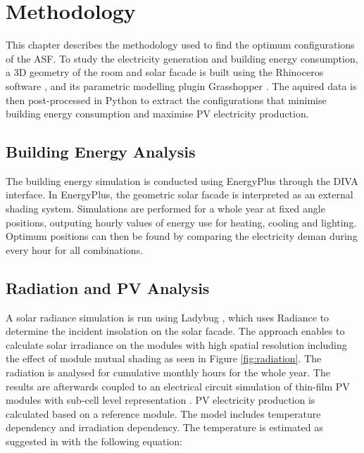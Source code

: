 \chapter{Methodology}

	This chapter describes the methodology used to find the optimum configurations of the ASF. To study the electricity generation and building energy consumption, a 3D geometry of the room and solar facade is built using the Rhinoceros software \cite{Rhino}, and its parametric modelling plugin Grasshopper \cite{grasshopper}. The aquired data is then post-processed in Python \cite{python} to extract the configurations that minimise building energy consumption and maximise PV electricity production.

	\section{Building Energy Analysis}

		The building energy simulation is conducted using EnergyPlus \cite{energyplus} through the DIVA \cite{DIVA} interface. In EnergyPlus, the geometric solar facade is interpreted as an external shading system. Simulations are performed for a whole year at fixed angle positions, outputing hourly values of energy use for heating, cooling and lighting. Optimum positions can then be found by comparing the electricity deman during every hour for all combinations. 

	\section{Radiation and PV Analysis}

		A solar radiance simulation is run using Ladybug \cite{roudsari2014ladybug},  which uses Radiance \cite{ward1994radiance} to determine the incident insolation on the solar facade. The approach enables to calculate solar irradiance on the modules with high spatial resolution including the effect of module mutual shading as seen in Figure \ref{fig:radiation}. The radiation is analysed for cumulative monthly hours for the whole year. The results are afterwards coupled to an electrical circuit simulation of thin-film PV modules with sub-cell level representation \cite{hofer2015PVSEC}. PV electricity production is calculated based on a reference module. The model includes temperature dependency and irradiation dependency. The temperature is estimated as suggested in \cite{Ross_Smokler_1986} with the following equation:

